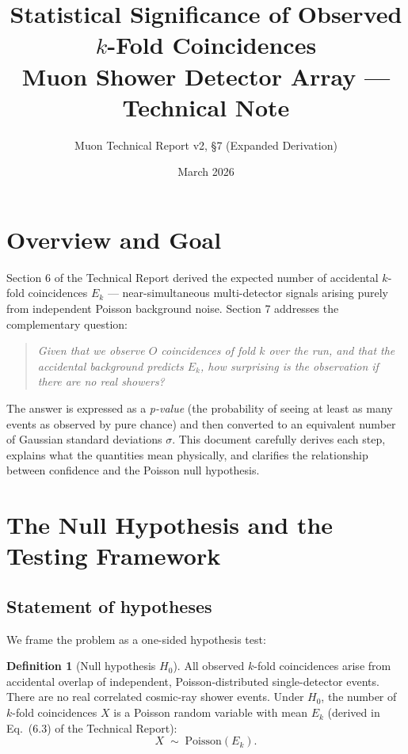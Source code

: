\documentclass[12pt]{article}
\title{\textbf{Statistical Significance of Observed $k$-Fold Coincidences}\\[6pt]
  \large Muon Shower Detector Array --- Technical Note}
\author{Muon Technical Report v2, \S7 (Expanded Derivation)}
\date{March 2026}
\theoremstyle{definition}
\newtheorem{definition}{Definition}
\theoremstyle{remark}
\newcommand{\Ho}{H_0}
\newcommand{\obs}{O}
\newcommand{\Eacc}{E}
\newcommand{\nsig}{\sigma}
\begin{document}
\maketitle
\tableofcontents
\newpage

\section{Overview and Goal}

Section 6 of the Technical Report derived the expected number of
accidental $k$-fold coincidences $\Eacc_k$ — near-simultaneous
multi-detector signals arising purely from independent Poisson background
noise.  Section 7 addresses the complementary question:

\begin{quote}
  \itshape
  Given that we observe $\obs$ coincidences of fold $k$ over the run,
  and that the accidental background predicts $\Eacc_k$, how surprising
  is the observation if there are \emph{no} real showers?
\end{quote}

The answer is expressed as a \emph{p-value} (the probability of seeing
at least as many events as observed by pure chance) and then converted to
an equivalent number of Gaussian standard deviations $\nsig$.  This
document carefully derives each step, explains what the quantities mean
physically, and clarifies the relationship between confidence and the
Poisson null hypothesis.

\section{The Null Hypothesis and the Testing Framework}

\subsection{Statement of hypotheses}

We frame the problem as a one-sided hypothesis test:

\begin{definition}[Null hypothesis $\Ho$]
  All observed $k$-fold coincidences arise from accidental overlap of
  independent, Poisson-distributed single-detector events.  There are no
  real correlated cosmic-ray shower events.  Under $\Ho$, the number of
  $k$-fold coincidences $X$ is a Poisson random variable with mean
  $\Eacc_k$ (derived in Eq.~(6.3) of the Technical Report):
  \begin{equation}
    X \;\sim\; \mathrm{Poisson}(\Eacc_k). \label{eq:null}
  \end{equation}
\end{definition}
\end{document}
